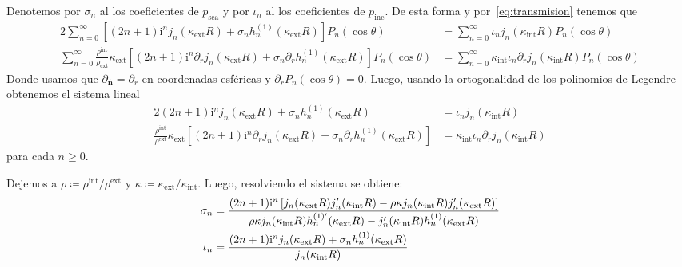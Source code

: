 \documentclass[11pt]{article}
\numberwithin{equation}{section}
\def\n{\hat{\textbf{n}}}
\let\i\relax
\def\i{\mathrm{i}}
\def\exterior{\textrm{ext}}
\def\interior{\textrm{int}}
\def\inc{\textrm{inc}}
\def\sca{\textrm{sca}}
\begin{document}
Denotemos por \(\sigma_n\) al los coeficientes de \(p_{\sca}\) y por 
\(\iota_n\) al los coeficientes de \(p_{\inc}\). De esta forma y 
por~\eqref{eq:transmision} tenemos que
\begin{alignat}{2}
	\sum_{n=0}^{\infty}
	\left[
		(2n + 1) \i^n j_{n}(\kappa_{\exterior} R)
		+
		\sigma_{n} h^{(1)}_{n}(\kappa_{\exterior} R)
	\right] P_{n}(\cos\theta)
	&=
	\sum_{n=0}^{\infty}
		\iota_{n} j_{n} (\kappa_{\interior} R)
		P_{n}(\cos\theta)
	\\
	\sum_{n=0}^{\infty}
	\frac{\rho^{\interior}}{\rho_{\exterior}}\kappa_{\exterior}
	\left[
		(2n + 1) \i^n \partial_{r} j_{n}(\kappa_{\exterior} R)
		+
		\sigma_{n} \partial_{r} h^{(1)}_{n}(\kappa_{\exterior} R)
	\right] P_{n}(\cos\theta)
	&=
	\sum_{n=0}^{\infty}
		\kappa_{\interior}
		\iota_{n} \partial_{r} j_{n} (\kappa_{\interior} R)
		P_{n}(\cos\theta)
\end{alignat}
Donde usamos que \(\partial_{\n} = \partial_{r}\) en coordenadas esféricas y
\(\partial_{r} P_{n}(\cos\theta) = 0\).
Luego, usando la ortogonalidad de los polinomios de Legendre obtenemos el 
sistema lineal
\begin{alignat}{2}
	(2n+1)\i^n j_{n}(\kappa_{\exterior} R)
	+
	\sigma_{n} h^{(1)}_{n}(\kappa_{\exterior} R)
	&=
	\iota_{n} j_{n}(\kappa_{\interior} R)
	\\
	\frac{\rho^{\interior}}{\rho^{\exterior}} \kappa_{\exterior}
	\left[
		(2n+1)\i^n \partial_{r} j_{n}(\kappa_{\exterior} R)
		+
		\sigma_{n} \partial_{r} h^{(1)}_{n}(\kappa_{\exterior} R)
	\right]
	&=
	\kappa_{\interior} \iota_{n} \partial_{r} j_{n}(\kappa_{\interior} R)
\end{alignat}
para cada \(n \ge 0\). 

Dejemos a \(\rho \coloneqq \rho^{\interior}/\rho^{\exterior}\) y \(\kappa
\coloneqq \kappa_{\exterior}/\kappa_{\interior}\). Luego, 
resolviendo el sistema se obtiene:
\begin{alignat}{2}
	\sigma_{n}
	&=
	\frac
	{%
		(2n+1) \i^n
		\left[
			j_n(\kappa_{\exterior} R)
			j'_{n}(\kappa_{\interior} R)
			-
			\rho \kappa
			j_{n}(\kappa_{\interior} R)
			j'_{n}(\kappa_{\exterior} R)
		\right]
	}
	{%
		\rho \kappa
		j_{n}(\kappa_{\interior} R)
		h^{(1)'}_{n}(\kappa_{\exterior} R)
		-
		j'_{n}(\kappa_{\interior} R)
		h^{(1)}_{n}(\kappa_{\exterior} R)
	}
	\\
	\iota_{n}
	&=
	\frac
		{(2n + 1) \i^n j_n(\kappa_{\exterior} R) + \sigma_{n} h^{(1)}_{n} (\kappa_{\exterior} R)}
		{j_{n}(\kappa_{\interior} R)}
\end{alignat}
\end{document}
